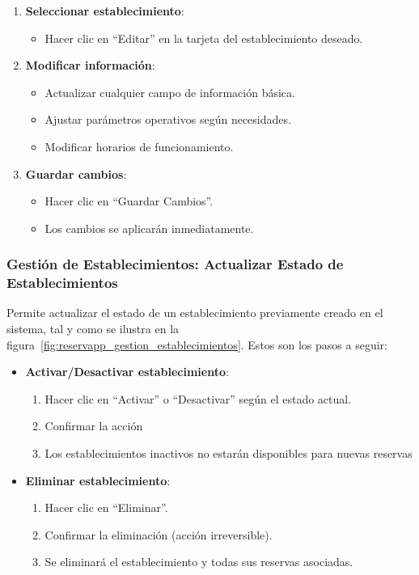 \begin{enumerate}
   \item \textbf{Seleccionar establecimiento}:
   \begin{itemize}
      \item Hacer clic en ``Editar'' en la tarjeta del establecimiento deseado.
   \end{itemize}
   \item \textbf{Modificar información}:
   \begin{itemize}
      \item Actualizar cualquier campo de información básica.
      \item Ajustar parámetros operativos según necesidades.
	  \item Modificar horarios de funcionamiento.
   \end{itemize}
   \item \textbf{Guardar cambios}:
   \begin{itemize}
      \item Hacer clic en ``Guardar Cambios''.
	  \item Los cambios se aplicarán inmediatamente.
   \end{itemize}
\end{enumerate}

\subsubsection{Gestión de Establecimientos: Actualizar Estado de Establecimientos}
Permite actualizar el estado de un establecimiento previamente creado en el sistema, tal y como se ilustra en la figura~\ref{fig:reservapp_gestion_establecimientos}. Estos son los pasos a seguir:

\begin{itemize}
   \item \textbf{Activar/Desactivar establecimiento}:
   \begin{enumerate}
      \item Hacer clic en ``Activar'' o ``Desactivar'' según el estado actual.
	  \item Confirmar la acción
	  \item Los establecimientos inactivos no estarán disponibles para nuevas reservas
   \end{enumerate}
   \item \textbf{Eliminar establecimiento}:
   \begin{enumerate}
      \item Hacer clic en ``Eliminar''.
      \item Confirmar la eliminación (acción irreversible).
	  \item Se eliminará el establecimiento y todas sus reservas asociadas.
   \end{enumerate}
\end{itemize}


